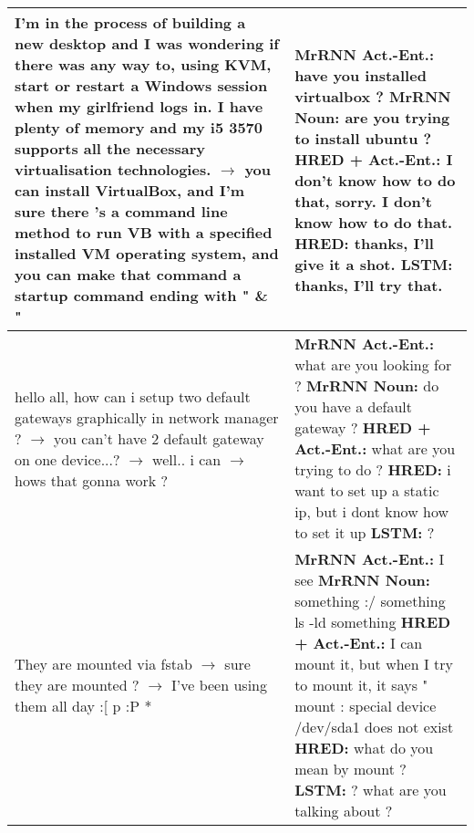 \documentclass{article}
\begin{document}
\begin{table}[ht]
\begin{tabular}{p{65mm}|p{60mm}}
        I'm in the process of building a new desktop and I was wondering if there was any way to, using KVM, start or restart a Windows session when my girlfriend logs in. I have plenty of memory and my i5 3570 supports all the necessary virtualisation technologies. $\rightarrow$ you can install VirtualBox, and I'm sure there 's a command line method to run VB with a specified installed VM operating system, and you can make that command a startup command ending with " \& " & \textbf{MrRNN Act.\@ -Ent.\@:} have you installed virtualbox ? \newline \textbf{MrRNN Noun:} are you trying to install ubuntu ? \newline \textbf{HRED + Act.\@-Ent.\@:} I don't know how to do that, sorry. I don't know how to do that. \newline \textbf{HRED:} thanks, I'll give it a shot. \newline \textbf{LSTM:} thanks, I'll try that. \\ \hline 
        hello all, how can i setup two default gateways graphically in network manager ? $\rightarrow$ you can't have 2 default gateway on one device...? $\rightarrow$ well.. i can $\rightarrow$ hows that gonna work ? & \textbf{MrRNN Act.\@ -Ent.\@:} what are you looking for ? \newline \textbf{MrRNN Noun:} do you have a default gateway ? \newline \textbf{HRED + Act.\@-Ent.\@:} what are you trying to do ? \newline \textbf{HRED:} i want to set up a static ip, but i dont know how to set it up \newline \textbf{LSTM:} ? \\ \hline 
        They are mounted via fstab $\rightarrow$ sure they are mounted ? $\rightarrow$ I've been using them all day :[ p :P * & \textbf{MrRNN Act.\@ -Ent.\@:} I see \newline \textbf{MrRNN Noun:} something :/ something ls -ld something \newline \textbf{HRED + Act.\@-Ent.\@:} I can mount it, but when I try to mount it, it says " mount : special device /dev/sda1 does not exist \newline \textbf{HRED:} what do you mean by mount ? \newline \textbf{LSTM:} ? what are you talking about ? \\ \hline
 \end{tabular}
\end{table}
\end{document}
